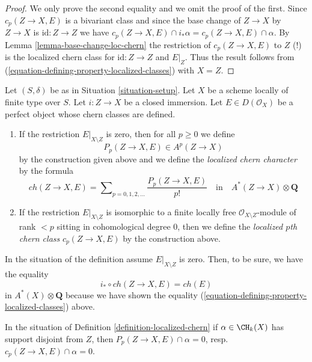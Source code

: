 \begin{proof}
We only prove the second equality and we omit the proof of the first.
Since $c_p(Z \to X, E)$ is a bivariant class and since the base
change of $Z \to X$ by $Z \to X$ is $\text{id} : Z \to Z$ we have
$c_p(Z \to X, E) \cap i_*\alpha = c_p(Z \to X, E) \cap \alpha$.
By Lemma \ref{lemma-base-change-loc-chern} the restriction of
$c_p(Z \to X, E)$ to $Z$ (!) is the localized chern class for
$\text{id} : Z \to Z$ and $E|_Z$. Thus the result follows from
(\ref{equation-defining-property-localized-classes}) with $X = Z$.
\end{proof}

\begin{definition}
\label{definition-localized-chern}
Let $(S, \delta)$ be as in Situation \ref{situation-setup}. Let $X$ be a scheme
locally of finite type over $S$. Let $i : Z \to X$ be a closed immersion.
Let $E \in D(\mathcal{O}_X)$ be a perfect object whose chern classes
are defined.
\begin{enumerate}
\item If the restriction $E|_{X \setminus Z}$ is zero, then for all
$p \geq 0$ we define
$$
P_p(Z \to X, E) \in A^p(Z \to X)
$$
by the construction given above and we define the
{\it localized chern character} by the formula
$$
ch(Z \to X, E) =
\sum\nolimits_{p = 0, 1, 2, \ldots} \frac{P_p(Z \to X, E)}{p!}
\quad\text{in}\quad A^*(Z \to X) \otimes \mathbf{Q}
$$
\item If the restriction $E|_{X \setminus Z}$ is isomorphic to a
finite locally free $\mathcal{O}_{X \setminus Z}$-module of rank $< p$
sitting in cohomological degree $0$, then we define the
{\it localized $p$th chern class} $c_p(Z \to X, E)$ by the construction above.
\end{enumerate}
\end{definition}

\noindent
In the situation of the definition assume $E|_{X \setminus Z}$ is zero.
Then, to be sure, we have the equality
$$
i_* \circ ch(Z \to X, E) = ch(E)
$$
in $A^*(X) \otimes \mathbf{Q}$ because we have shown the
equality (\ref{equation-defining-property-localized-classes}) above.

\begin{lemma}
\label{lemma-loc-chern-disjoint}
In the situation of Definition \ref{definition-localized-chern}
if $\alpha \in \CH_k(X)$ has support disjoint from $Z$, then
$P_p(Z \to X, E) \cap \alpha = 0$, resp.\ $c_p(Z \to X, E) \cap \alpha = 0$.
\end{lemma}


